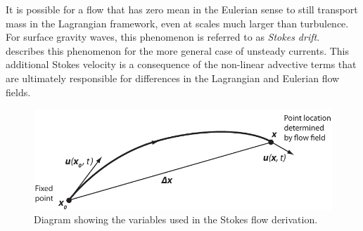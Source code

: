 \documentclass[11pt]{report}
\numberwithin{equation}{section}
\begin{document}
It is possible for a flow that has zero mean in the Eulerian sense to still transport mass in the Lagrangian framework, even at scales much larger than turbulence.  For surface gravity waves, this phenomenon is referred to as {\it Stokes drift}.  \citet{longuet-higgins:69} describes this phenomenon for the more general case of unsteady currents.  This additional {Stokes velocity} is a consequence of the non-linear advective terms that are ultimately responsible for differences in the Lagrangian and Eulerian flow fields.

\begin{figure}[tb]
    \centering
    \includegraphics[width=5in]{stokes-diagram}   
    \caption{Diagram showing the variables used in the Stokes flow derivation.}
    \label{fig:stokes-diagram}
\end{figure}
\end{document}
